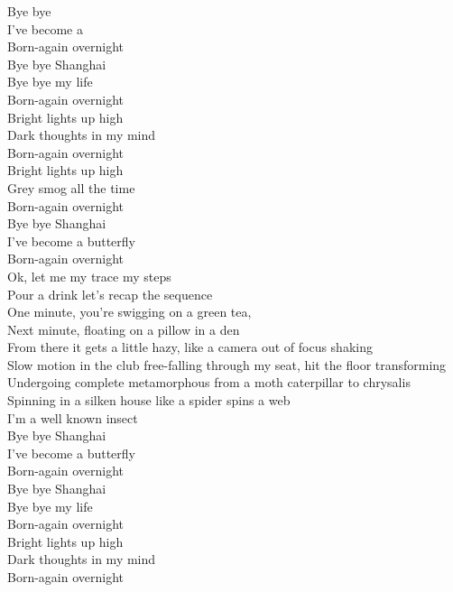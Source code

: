 


Bye bye  \\
I've become a  \\
Born-again overnight \\
Bye bye Shanghai \\
Bye bye my life \\
Born-again overnight \\
Bright lights up high \\
Dark thoughts in my mind \\
Born-again overnight \\
Bright lights up high \\
Grey smog all the time \\
Born-again overnight \\
Bye bye Shanghai \\
I've become a butterfly \\
Born-again overnight \\

Ok, let me my trace my steps \\
Pour a drink let's recap the sequence \\
One minute, you're swigging on a green tea, \\
Next minute, floating on a pillow in a den \\
From there it gets a little hazy, like a camera out of focus shaking \\
Slow motion in the club free-falling through my seat, hit the floor transforming \\
Undergoing complete metamorphous from a moth caterpillar to chrysalis \\
Spinning in a silken house like a spider spins a web \\
I'm a well known insect \\

Bye bye Shanghai \\
I've become a butterfly \\
Born-again overnight \\
Bye bye Shanghai \\
Bye bye my life \\
Born-again overnight \\
Bright lights up high \\
Dark thoughts in my mind \\
Born-again overnight \\

